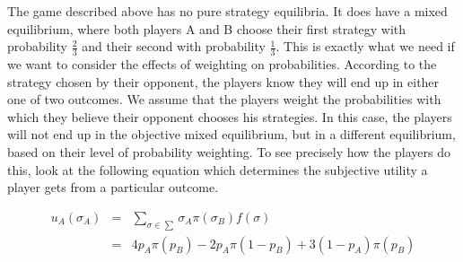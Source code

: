 \documentclass[a4paper,10pt]{article}
\numberwithin{equation}{section}
\begin{document}
The game described above has no pure strategy equilibria. It does have a mixed equilibrium, where both players A and B choose their first strategy with probability $\frac{2}{3}$ and their second with probability $\frac{1}{3}$. This is exactly what we need if we want to consider the effects of weighting on probabilities. According to the strategy chosen by their opponent, the players know they will end up in either one of two outcomes. We assume that the players weight the probabilities with which they believe their opponent chooses his strategies. In this case, the players will not end up in the objective mixed equilibrium, but in a different equilibrium, based on their level of probability weighting. To see precisely how the players do this, look at the following equation which determines the subjective utility a player gets from a particular outcome.

\begin{equation}
\label{eq:myUtility}
\begin{array}{rcl}
u_A(\sigma_A)&=&\sum_{\sigma \in \sum} \sigma_A \pi(\sigma_B) f(\sigma)\\
 &=&4 p_A \pi(p_B) - 2 p_A \pi(1-p_B) + 3 (1-p_A) \pi(p_B)
\end{array}
\end{equation}\\
\end{document}
